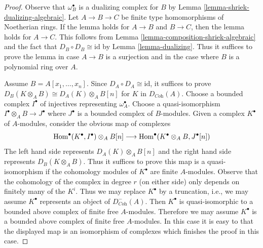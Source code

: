 \begin{proof}
Observe that $\omega_B^\bullet$ is a dualizing complex for $B$ by
Lemma \ref{lemma-shriek-dualizing-algebraic}.
Let $A \to B \to C$ be finite type homomorphisms of Noetherian rings.
If the lemma holds for $A \to B$ and $B \to C$, then the lemma holds for
$A \to C$. This follows from
Lemma \ref{lemma-composition-shriek-algebraic}
and the fact that $D_B \circ D_B \cong \text{id}$ by
Lemma \ref{lemma-dualizing}.
Thus it suffices to prove the lemma in case $A \to B$ is
a surjection and in the case where $B$ is a
polynomial ring over $A$.

\medskip\noindent
Assume $B = A[x_1, \ldots, x_n]$. Since $D_A \circ D_A \cong \text{id}$,
it suffices to prove
$D_B(K \otimes_A B) \cong D_A(K) \otimes_A B[n]$ for $K$
in $D_{\textit{Coh}}(A)$.
Choose a bounded complex $I^\bullet$ of injectives representing
$\omega_A^\bullet$. Choose a quasi-isomorphism
$I^\bullet \otimes_A B \to J^\bullet$ where $J^\bullet$
is a bounded complex of $B$-modules. Given a complex
$K^\bullet$ of $A$-modules, consider the obvious
map of complexes
$$
\mathop{\mathrm{Hom}}\nolimits^\bullet(K^\bullet, I^\bullet) \otimes_A B[n]
\longrightarrow
\mathop{\mathrm{Hom}}\nolimits^\bullet(K^\bullet \otimes_A B, J^\bullet[n])
$$
The left hand side represents $D_A(K) \otimes_A B[n]$ and the right hand
side represents $D_B(K \otimes_A B)$. Thus it suffices to prove this
map is a quasi-isomorphism if the cohomology modules
of $K^\bullet$ are finite $A$-modules. Observe that the
cohomology of the complex in degree $r$ (on either side)
only depends on finitely many of the $K^i$. Thus we may
replace $K^\bullet$ by a truncation, i.e., we may assume
$K^\bullet$ represents an object of $D^-_{\textit{Coh}}(A)$.
Then $K^\bullet$ is quasi-isomorphic to a bounded
above complex of finite free $A$-modules.
Therefore we may assume $K^\bullet$ is a bounded
above complex of finite free $A$-modules.
In this case it is easy to that the
displayed map is an isomorphism of complexes which finishes
the proof in this case.


\end{proof}
